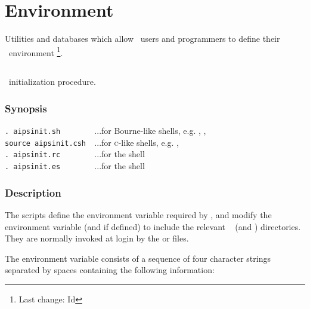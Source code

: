 \chapter{Environment}
\label{Environment}

Utilities and databases which allow \aipspp\ users and programmers to
define their \aipspp\ environment \footnote{Last change:
$ $Id$ $}.


\section{}
\label{aipsinit}
\label{aipsinit.csh}
\label{aipsinit.sh}

\aipspp\ initialization procedure.

\subsection*{Synopsis}

\begin{synopsis}
   \verb+. aipsinit.sh        +...for Bourne-like shells, e.g. ,
                                  ,  \\
   \verb+source aipsinit.csh  +...for \textsc{c}-like shells, e.g.
                                  ,  \\
   \verb+. aipsinit.rc        +...for the  shell \\
   \verb+. aipsinit.es        +...for the  shell
\end{synopsis}

\subsection*{Description}

The  scripts define the  environment variable
required by \aipspp, and modify the  environment variable (and
 if defined) to include the relevant \aipspp\  (and
) directories.  They are normally invoked at login by the
 or  files.

The  environment variable consists of a sequence of four
character strings separated by spaces containing the following information:


